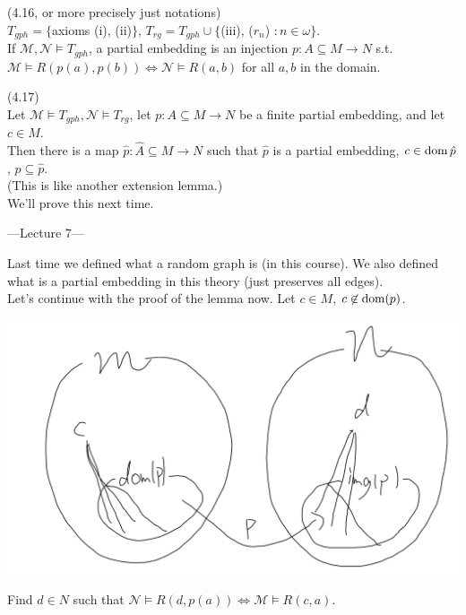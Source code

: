 \documentclass[a4paper]{article}
\begin{document}
\begin{defi} (4.16, or more precisely just notations)\\
    $T_{gph} = \{$axioms (i), (ii)$\}$, $T_{rg} = T_{gph} \cup \{$(iii), ($r_n$) $:n \in \omega\}$.\\
    If $\mathcal{M},\mathcal{N} \vDash T_{gph}$, a partial embedding is an injection $p: A \subseteq M \to N$ s.t. $\mathcal{M} \vDash R(p(a),p(b)) \iff \mathcal{N} \vDash R(a,b)$ for all $a,b$ in the domain.
\end{defi}

\begin{lemma} (4.17)\\
    Let $\mathcal{M} \vDash T_{gph},\mathcal{N} \vDash T_{rg}$, let $p:A \subseteq M \to N$ be a finite partial embedding, and let $c \in M$.\\
    Then there is a map $\hat{p}:\hat{A} \subseteq M \to N$ such that $\hat{p}$ is a partial embedding, $c \in \operatorname{dom} \hat{p}$, $p\subseteq \hat{p}$.\\
    (This is like another extension lemma.)\\
    We'll prove this next time.
    
    ---Lecture 7---

    Last time we defined what a random graph is (in this course). We also defined what is a partial embedding in this theory (just preserves all edges).\\
    Let's continue with the proof of the lemma now. Let $c \in M$, $c \not\in \operatorname{dom}(p)$.

    \includegraphics[scale=0.5]{image/Model_06.png}

    Find $d \in N$ such that $\mathcal{N} \vDash R(d,p(a)) \iff \mathcal{M} \vDash R(c,a)$.
\end{lemma}
\end{document}
